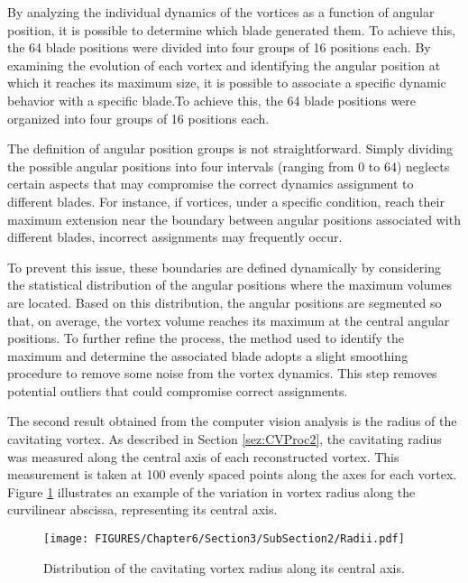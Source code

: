 By analyzing the individual dynamics of the vortices as a function of angular position, it is possible to determine which blade generated them.
To achieve this, the 64 blade positions were divided into four groups of 16 positions each. By examining the evolution of each vortex and identifying the angular position at which it reaches its maximum size, it is possible to associate a specific dynamic behavior with a specific blade.To achieve this, the 64 blade positions were organized into four groups of 16 positions each.

The definition of angular position groups is not straightforward. 
Simply dividing the possible angular positions into four intervals (ranging from 0 to 64) neglects certain aspects that may compromise the correct dynamics assignment to different blades.
For instance, if vortices, under a specific condition,  reach their maximum 
extension near the boundary between angular positions associated with different blades, incorrect assignments may frequently occur.

To prevent this issue, these boundaries are defined dynamically by considering the statistical distribution of the angular positions where the maximum volumes are located. Based on this distribution, the angular positions are segmented so that, on average, the vortex volume reaches its maximum at the central angular positions.
To further refine the process, the method used to identify the maximum and determine the associated blade adopts a slight smoothing procedure to remove some noise from the vortex dynamics. This step removes potential outliers that could compromise correct assignments.

The second result obtained from the computer vision analysis is the radius of the cavitating vortex. As described in Section \ref{sez:CVProc2}, the cavitating radius was measured along the central axis of each reconstructed vortex. This measurement is taken at 100 evenly spaced points along the axes for each vortex.
Figure \ref{fig:RadiiAx} illustrates an example of the variation in vortex radius along the curvilinear abscissa, representing its central axis. 

\begin{figure}[htbp]
    \centering
    \texttt{[image: FIGURES/Chapter6/Section3/SubSection2/Radii.pdf]} 
    \caption{Distribution of the cavitating vortex radius along its central axis.}
    \label{fig:RadiiAx}
\end{figure}

